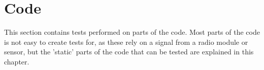 \section{Code}
This section contains tests performed on parts of the code. Most parts of the code is not easy to create tests for, as these rely on a signal from a radio module or sensor, but the 'static' parts of the code that can be tested are explained in this chapter.

 